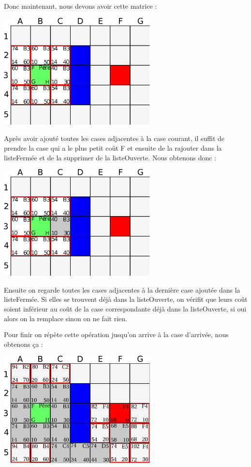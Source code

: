 			Donc maintenant, nous devons avoir cette matrice :
			\begin{center}
				\includegraphics[width=8cm]{./Analyse/Img/Grille3.eps}
			\end{center}
		
			Après avoir ajouté toutes les cases adjacentes à la case courant, il suffit de prendre la case qui a le plus petit coût F et ensuite de la rajouter dans la listeFermée et de la supprimer de la listeOuverte. Nous obtenons donc :
			\begin{center}
				\includegraphics[width=8cm]{./Analyse/Img/Grille4.eps}
			\end{center}
		
			Ensuite on regarde toutes les cases adjacentes à la dernière case ajoutée dans la listeFermée. Si elles se trouvent déjà dans la listeOuverte, on vérifit que leurs coût soient inférieur au coût de la case correspondante déjà dans la listeOuverte, si oui alors on la remplace sinon on ne fait rien.
		
			Pour finir on répète cette opération jusqu'on arrive à la case d'arrivée, nous obtenons ça :
			\begin{center}
				\includegraphics[width=8cm]{./Analyse/Img/Grille5.eps}
			\end{center}
		
